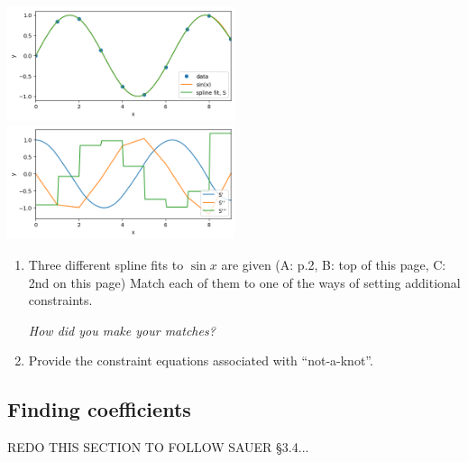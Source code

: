 \documentclass[12pt,letterpaper,noanswers]{exam}
\begin{document}
\includegraphics[width=0.5\textwidth]{img/Class09natural.png}
\includegraphics[width=0.5\textwidth]{img/Class09naturalderiv.png}

\begin{enumerate}[resume=classQ]
    \item Three different spline fits to $\sin x$ are given (A: p.2, B: top of this page, C: 2nd on this page)  Match each of them to one of the ways of setting additional constraints.
    
    \emph{How did you make your matches?}
    
    \vspace{1cm}
    
    \item Provide the constraint equations associated with ``not-a-knot''.

    
\end{enumerate}

\subsection*{Finding coefficients}

REDO THIS SECTION TO FOLLOW SAUER \S 3.4...
\end{document}
